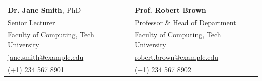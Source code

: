 
\noindent
\begin{tabularx}{\linewidth}{@{}X X@{}}
  \textbf{Dr. Jane Smith}, PhD &
  \textbf{Prof. Robert Brown} \\
  Senior Lecturer &
  Professor \& Head of Department \\
  Faculty of Computing, Tech University &
  Faculty of Computing, Tech University \\
  \href{mailto:jane.smith@example.edu}{jane.smith@example.edu} &
  \href{mailto:robert.brown@example.edu}{robert.brown@example.edu} \\
  (+1) 234 567 8901 &
  (+1) 234 567 8902 \\
\end{tabularx}